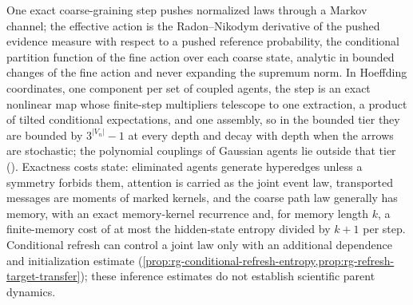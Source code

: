 One exact coarse-graining step pushes normalized laws through a Markov channel; the
effective action is the Radon--Nikodym derivative of the pushed evidence measure
with respect to a pushed reference probability, the conditional partition function
of the fine action over each coarse state, analytic in bounded changes of the fine
action and never expanding the supremum norm. In Hoeffding coordinates, one
component per set of coupled agents, the step is an exact nonlinear map whose
finite-step multipliers telescope to one extraction, a product of tilted
conditional expectations, and one assembly, so in the bounded tier they are bounded by
$3^{\lvert V_n\rvert}-1$ at every depth and decay with depth when the arrows are stochastic;
the polynomial couplings of Gaussian agents lie outside that tier (). Exactness costs state: eliminated agents
generate hyperedges unless a symmetry forbids them, attention is carried as the
joint event law, transported messages are moments of marked kernels, and the coarse
path law generally has memory, with an exact memory-kernel recurrence and, for
memory length $k$, a finite-memory cost of at most the hidden-state entropy divided
by $k+1$ per step.
Conditional refresh can control a joint law only with an additional
dependence and initialization estimate
(\cref{prop:rg-conditional-refresh-entropy,prop:rg-refresh-target-transfer});
these inference estimates do not establish scientific parent dynamics.
